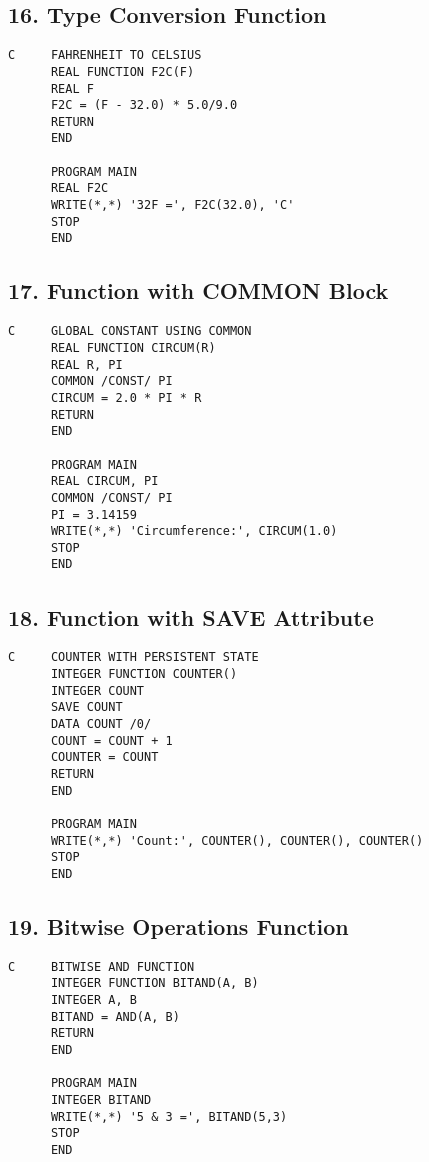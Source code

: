 \documentclass{book}
\begin{document}
\subsection*{16. Type Conversion Function}
\begin{verbatim}
C     FAHRENHEIT TO CELSIUS
      REAL FUNCTION F2C(F)
      REAL F
      F2C = (F - 32.0) * 5.0/9.0
      RETURN
      END

      PROGRAM MAIN
      REAL F2C
      WRITE(*,*) '32F =', F2C(32.0), 'C'
      STOP
      END
\end{verbatim}

\subsection*{17. Function with COMMON Block}
\begin{verbatim}
C     GLOBAL CONSTANT USING COMMON
      REAL FUNCTION CIRCUM(R)
      REAL R, PI
      COMMON /CONST/ PI
      CIRCUM = 2.0 * PI * R
      RETURN
      END

      PROGRAM MAIN
      REAL CIRCUM, PI
      COMMON /CONST/ PI
      PI = 3.14159
      WRITE(*,*) 'Circumference:', CIRCUM(1.0)
      STOP
      END
\end{verbatim}

\subsection*{18. Function with SAVE Attribute}
\begin{verbatim}
C     COUNTER WITH PERSISTENT STATE
      INTEGER FUNCTION COUNTER()
      INTEGER COUNT
      SAVE COUNT
      DATA COUNT /0/
      COUNT = COUNT + 1
      COUNTER = COUNT
      RETURN
      END

      PROGRAM MAIN
      WRITE(*,*) 'Count:', COUNTER(), COUNTER(), COUNTER()
      STOP
      END
\end{verbatim}

\subsection*{19. Bitwise Operations Function}
\begin{verbatim}
C     BITWISE AND FUNCTION
      INTEGER FUNCTION BITAND(A, B)
      INTEGER A, B
      BITAND = AND(A, B)
      RETURN
      END

      PROGRAM MAIN
      INTEGER BITAND
      WRITE(*,*) '5 & 3 =', BITAND(5,3)
      STOP
      END
\end{verbatim}
\end{document}
